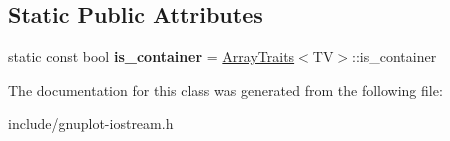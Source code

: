 \subsection*{Static Public Attributes}
\begin{DoxyCompactItemize}
\item 
\mbox{\label{classgnuplotio_1_1IteratorRange_a3f79d84bdf18761b6e49ae54d050f8ff}} 
static const bool {\bfseries is\+\_\+container} = \hyperlink{classgnuplotio_1_1ArrayTraits}{Array\+Traits}$<$TV$>$\+::is\+\_\+container
\end{DoxyCompactItemize}


The documentation for this class was generated from the following file\+:\begin{DoxyCompactItemize}
\item 
include/gnuplot-\/iostream.\+h\end{DoxyCompactItemize}
